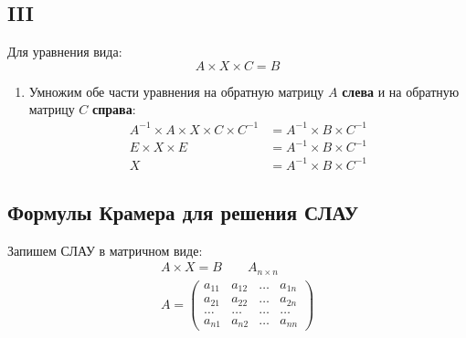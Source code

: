 \subsection*{III}

Для уравнения вида: \[
A \times X \times C = B
\] 
\begin{enumerate}
  \item Умножим обе части уравнения на обратную матрицу $A$ \textbf{слева} и на обратную матрицу $C$ \textbf{справа}:
  \begin{align*}
    A^{-1} \times  A \times  X \times C \times C^{-1} &= A^{-1} \times B \times C^{-1} \\
    E \times  X \times E &= A^{-1} \times B \times C^{-1} \\
    X &= A^{-1} \times B \times C^{-1}
  \end{align*}
\end{enumerate}

\subsection{Формулы Крамера для решения СЛАУ}

Запишем СЛАУ в матричном виде: 
\begin{gather*}
  A \times X = B \qquad A_{n \times n} \\
  A = \left( 
  \begin{matrix}
    a_{11} & a_{12} & \ldots & a_{1n} \\
    a_{21} & a_{22} & \ldots & a_{2n} \\
    \ldots & \ldots & \ldots & \ldots \\
    a_{n1} & a_{n2} & \ldots & a_{nn}
  \end{matrix}
  \right) 
\end{gather*}

